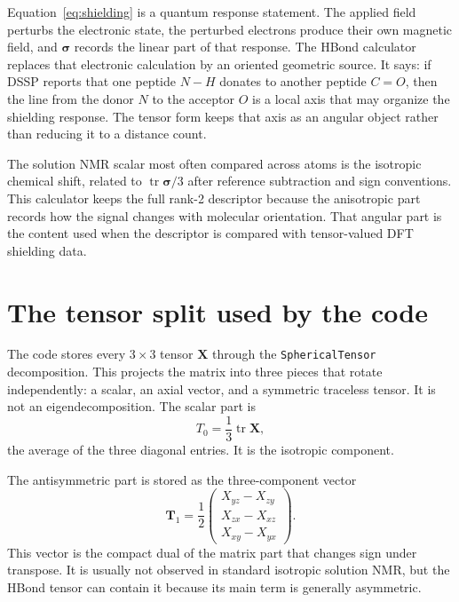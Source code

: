 \documentclass[11pt]{article}
\begin{document}
Equation~\eqref{eq:shielding} is a quantum response statement. The applied
field perturbs the electronic state, the perturbed electrons produce their own
magnetic field, and \(\bm\sigma\) records the linear part of that response. The
HBond calculator replaces that electronic calculation by an oriented geometric
source. It says: if DSSP reports that one peptide \(N-H\) donates to another
peptide \(C=O\), then the line from the donor \(N\) to the acceptor \(O\) is a
local axis that may organize the shielding response. The tensor form keeps
that axis as an angular object rather than reducing it to a distance count.

The solution NMR scalar most often compared across atoms is the isotropic
chemical shift, related to \(\operatorname{tr}\bm\sigma/3\) after reference
subtraction and sign conventions. This calculator keeps the full rank-2
descriptor because the anisotropic part records how the signal changes with
molecular orientation. That angular part is the content used when the
descriptor is compared with tensor-valued DFT shielding data.

\section{The tensor split used by the code}

The code stores every \(3\times 3\) tensor \(\bm X\) through the
\texttt{SphericalTensor} decomposition. This projects the matrix into three
pieces that rotate independently: a scalar, an axial vector, and a symmetric
traceless tensor. It is not an eigendecomposition. The scalar part is
\begin{equation}
  T_0 = \frac{1}{3}\operatorname{tr}\bm X ,
  \label{eq:t0}
\end{equation}
the average of the three diagonal entries. It is the isotropic component.

The antisymmetric part is stored as the three-component vector
\begin{equation}
  \bm T_1 =
  \frac{1}{2}
  \begin{pmatrix}
    X_{yz}-X_{zy}\\
    X_{zx}-X_{xz}\\
    X_{xy}-X_{yx}
  \end{pmatrix}.
  \label{eq:t1}
\end{equation}
This vector is the compact dual of the matrix part that changes sign under
transpose. It is usually not observed in standard isotropic solution NMR, but
the HBond tensor can contain it because its main term is generally asymmetric.
\end{document}
